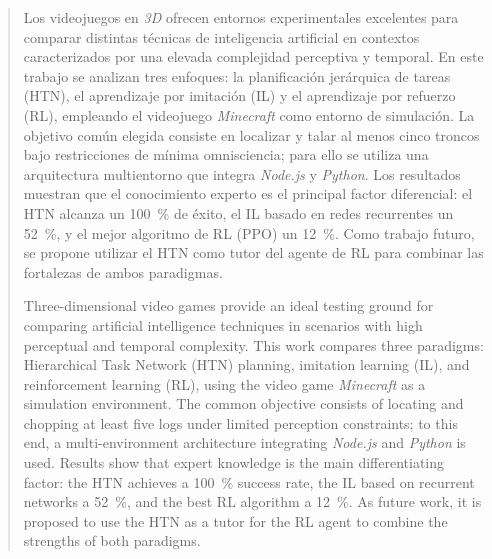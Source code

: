 \pagestyle{empty}
\begin{abstract}
Los videojuegos en \textit{3D} ofrecen entornos experimentales excelentes para comparar distintas 
técnicas de inteligencia artificial en contextos caracterizados por una elevada complejidad perceptiva y temporal. 
En este trabajo se analizan tres enfoques: la planificación jerárquica de tareas (HTN), el aprendizaje por imitación (IL) 
y el aprendizaje por refuerzo (RL), empleando el videojuego \textit{Minecraft} como entorno de simulación. 
La objetivo común elegida consiste en localizar y talar al menos cinco troncos 
bajo restricciones de mínima omnisciencia; para ello se utiliza
una arquitectura multientorno que integra \textit{Node.js} y \textit{Python}.
Los resultados muestran que el conocimiento experto es el principal factor
diferencial: el HTN alcanza un \qty{100}{\percent} de éxito, el IL basado en
redes recurrentes un \qty{52}{\percent}, y el mejor algoritmo de RL (PPO) un
\qty{12}{\percent}. Como trabajo futuro, se propone utilizar el HTN como tutor
del agente de RL para combinar las fortalezas de ambos paradigmas.

\vspace*{25pt}

\begin{segundoresumo}
Three-dimensional video games provide an ideal testing ground for comparing artificial
intelligence techniques in scenarios with high perceptual and temporal
complexity. This work compares three paradigms: Hierarchical Task Network (HTN)
planning, imitation learning (IL), and reinforcement learning (RL), using the
video game \textit{Minecraft} as a simulation environment. The common objective consists of locating and chopping at least five logs
under limited perception constraints; to this end, a multi-environment
architecture integrating \textit{Node.js} and \textit{Python} is used.
Results show that expert knowledge is the main differentiating
factor: the HTN achieves a \qty{100}{\percent} success rate, the IL based on recurrent
networks a \qty{52}{\percent}, and the best RL algorithm a
\qty{12}{\percent}. As future work, it is proposed to use the HTN as a tutor
for the RL agent to combine the strengths of both paradigms.
\end{segundoresumo}

\vspace*{25pt}

\end{abstract}
\pagestyle{fancy}

